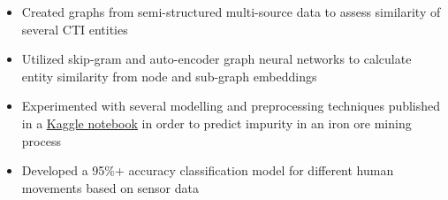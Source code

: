 
 \newline \vspace{2px}
\begin{itemize}
    \item Created graphs from semi-structured multi-source data to assess similarity of several CTI entities
    \item Utilized skip-gram and auto-encoder graph neural networks to calculate entity similarity from node and sub-graph embeddings
\end{itemize}

\divider

 \newline \vspace{2px}
\begin{itemize}
    \item Experimented with several modelling and preprocessing techniques published in a \href{https://www.kaggle.com/code/mkoerner1/iron-mining-production-prediction/notebook}{\underline{Kaggle notebook}} in order to predict impurity in an iron ore mining process
\end{itemize}

\divider

 \newline \vspace{2px}
\begin{itemize}
    \item Developed a 95\%+ accuracy classification model for different human movements based on sensor data
\end{itemize}

